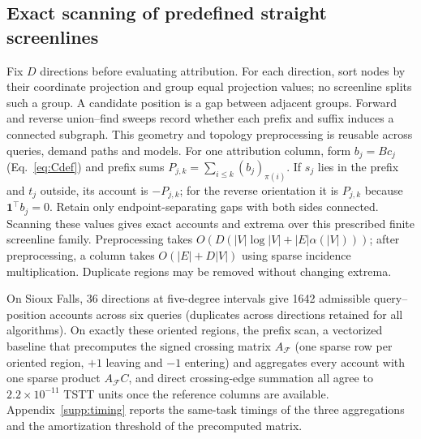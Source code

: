 \subsection{Exact scanning of predefined straight screenlines}\label{sec:scan}
Fix $D$ directions before evaluating attribution. For each direction, sort nodes by their coordinate projection and group equal projection values; no screenline splits such a group. A candidate position is a gap between adjacent groups. Forward and reverse union--find sweeps record whether each prefix and suffix induces a connected subgraph. This geometry and topology preprocessing is reusable across queries, demand paths and models.
For one attribution column, form $b_j=Bc_j$ (Eq.~\eqref{eq:Cdef}) and prefix sums $P_{j,k}=\sum_{i\leq k}(b_j)_{\pi(i)}$. If $s_j$ lies in the prefix and $t_j$ outside, its account is $-P_{j,k}$; for the reverse orientation it is $P_{j,k}$ because $\mathbf1^\top b_j=0$. Retain only endpoint-separating gaps with both sides connected. Scanning these values gives exact accounts and extrema over this prescribed finite screenline family. Preprocessing takes $O(D(|V|\log|V|+|E|\alpha(|V|)))$; after preprocessing, a column takes $O(|E|+D|V|)$ using sparse incidence multiplication. Duplicate regions may be removed without changing extrema.

On Sioux Falls, 36 directions at five-degree intervals give 1642 admissible query--position accounts across six queries (duplicates across directions retained for all algorithms). On exactly these oriented regions, the prefix scan, a vectorized baseline that precomputes the signed crossing matrix $A_{\mathcal F}$ (one sparse row per oriented region, $+1$ leaving and $-1$ entering) and aggregates every account with one sparse product $A_{\mathcal F}C$, and direct crossing-edge summation all agree to $2.2\times10^{-11}$ TSTT units once the reference columns are available. Appendix~\ref{supp:timing} reports the same-task timings of the three aggregations and the amortization threshold of the precomputed matrix.
